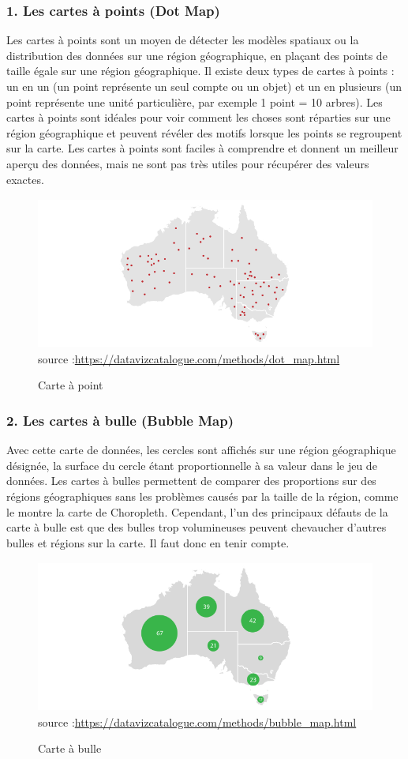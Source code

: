 \documentclass[french, a4paper, 12pt]{report}
\begin{document}
\subsubsection{1. Les cartes à points (Dot Map)}
Les cartes à points sont un moyen de détecter les modèles spatiaux ou la distribution des données sur une région géographique, en plaçant des points de taille égale sur une région géographique.
Il existe deux types de cartes à points : un en un (un point représente un seul compte ou un objet) et un en plusieurs (un point représente une unité particulière, par exemple 1 point = 10 arbres).
Les cartes à points sont idéales pour voir comment les choses sont réparties sur une région géographique et peuvent révéler des motifs lorsque les points se regroupent sur la carte. Les cartes à points sont faciles à comprendre et donnent un meilleur aperçu des données, mais ne sont pas très utiles pour récupérer des valeurs exactes.
\begin{figure}[!ht]
    \centering
    \includegraphics[height=5cm]{images/dot_map.png}
     \scriptsize{source :\url{https://datavizcatalogue.com/methods/dot_map.html}}
     \caption{Carte à point}
    \label{fig:2.4}
\end{figure}
\subsubsection{2. Les cartes à bulle (Bubble Map)}
Avec cette carte de données, les cercles sont affichés sur une région géographique désignée, la surface du cercle étant proportionnelle à sa valeur dans le jeu de données. Les cartes à bulles permettent de comparer des proportions sur des régions géographiques sans les problèmes causés par la taille de la région, comme le montre la carte de Choropleth. Cependant, l'un des principaux défauts de la carte à bulle est que des bulles trop volumineuses peuvent chevaucher d'autres bulles et régions sur la carte. Il faut donc en tenir compte.
\begin{figure}[!ht]
    \centering
    \includegraphics[height=5cm]{images/bubble_map.png}
    \scriptsize{source :\url{https://datavizcatalogue.com/methods/bubble_map.html}}
    \caption{Carte à bulle }
    \label{fig:2.5}
\end{figure}
\end{document}
